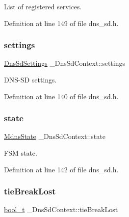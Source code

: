 List of registered services. 



Definition at line 149 of file dns\+\_\+sd.\+h.

\mbox{\label{struct__DnsSdContext_a83854c45c02af3c5d28b81f33800c523}} 
\subsubsection{\texorpdfstring{settings}{settings}}
{\footnotesize\ttfamily \hyperlink{structDnsSdSettings}{Dns\+Sd\+Settings} \+\_\+\+Dns\+Sd\+Context\+::settings}



D\+N\+S-\/\+SD settings. 



Definition at line 140 of file dns\+\_\+sd.\+h.

\mbox{\label{struct__DnsSdContext_af0a7dc8fa888e2e53b530d33ab7f1dfe}} 
\subsubsection{\texorpdfstring{state}{state}}
{\footnotesize\ttfamily \hyperlink{mdns__responder_8h_a96ee67ecc8252ba576e72c97cd8f7fd3}{Mdns\+State} \+\_\+\+Dns\+Sd\+Context\+::state}



F\+SM state. 



Definition at line 142 of file dns\+\_\+sd.\+h.

\mbox{\label{struct__DnsSdContext_a51005b2d2c528162ee876e596d8e0c28}} 
\subsubsection{\texorpdfstring{tie\+Break\+Lost}{tieBreakLost}}
{\footnotesize\ttfamily \hyperlink{compiler__port_8h_a812d16e5494522586b3784e55d479912}{bool\+\_\+t} \+\_\+\+Dns\+Sd\+Context\+::tie\+Break\+Lost}



